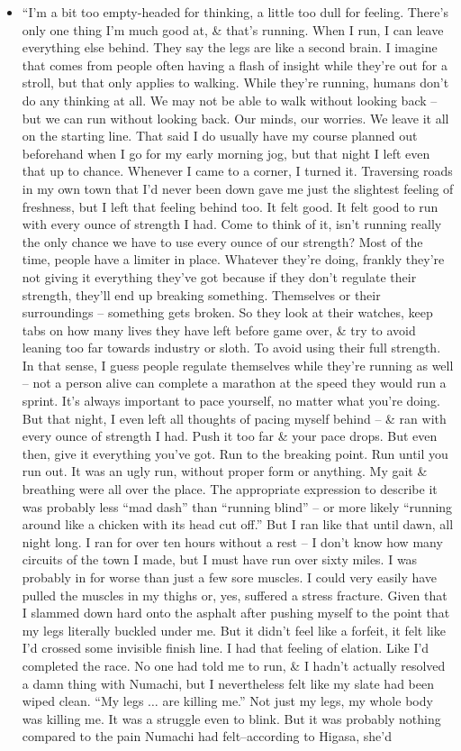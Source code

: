 \documentclass{article}
\begin{document}
\begin{enumerate}
\begin{itemize}
    	\item ``I'm a bit too empty-headed for thinking, a little too dull for feeling. There's only one thing I'm much good at, \& that's running. When I run, I can leave everything else behind. They say the legs are like a second brain. I imagine that comes from people often having a flash of insight while they're out for a stroll, but that only applies to walking. While they're running, humans don't do any thinking at all. We may not be able to walk without looking back -- but we can run without looking back. Our minds, our worries. We leave it all on the starting line. That said I do usually have my course planned out beforehand when I go for my early morning jog, but that night I left even that up to chance. Whenever I came to a corner, I turned it. Traversing roads in my own town that I'd never been down gave me just the slightest feeling of freshness, but I left that feeling behind too. It felt good. It felt good to run with every ounce of strength I had. Come to think of it, isn't running really the only chance we have to use every ounce of our strength? Most of the time, people have a limiter in place. Whatever they're doing, frankly they're not giving it everything they've got because if they don't regulate their strength, they'll end up breaking something. Themselves or their surroundings -- something gets broken. So they look at their watches, keep tabs on how many lives they have left before game over, \& try to avoid leaning too far towards industry or sloth. To avoid using their full strength. In that sense, I guess people regulate themselves while they're running as well -- not a person alive can complete a marathon at the speed they would run a sprint. It's always important to pace yourself, no matter what you're doing. But that night, I even left all thoughts of pacing myself behind -- \& ran with every ounce of strength I had. Push it too far \& your pace drops. But even then, give it everything you've got. Run to the breaking point. Run until you run out. It was an ugly run, without proper form or anything. My gait \& breathing were all over the place. The appropriate expression to describe it was probably less ``mad dash'' than ``running blind'' -- or more likely ``running around like a chicken with its head cut off.'' But I ran like that until dawn, all night long. I ran for over ten hours without a rest -- I don't know how many circuits of the town I made, but I must have run over sixty miles. I was probably in for worse than just a few sore muscles. I could very easily have pulled the muscles in my thighs or, yes, suffered a stress fracture. Given that I slammed down hard onto the asphalt after pushing myself to the point that my legs literally buckled under me. But it didn't feel like a forfeit, it felt like I'd crossed some invisible finish line. I had that feeling of elation. Like I'd completed the race. No one had told me to run, \& I hadn't actually resolved a damn thing with Numachi, but I nevertheless felt like my slate had been wiped clean. ``My legs $\ldots$ are killing me.'' Not just my legs, my whole body was killing me. It was a struggle even to blink. But it was probably nothing compared to the pain Numachi had felt--according to Higasa, she'd 
\end{itemize}
\end{enumerate}
\end{document}
